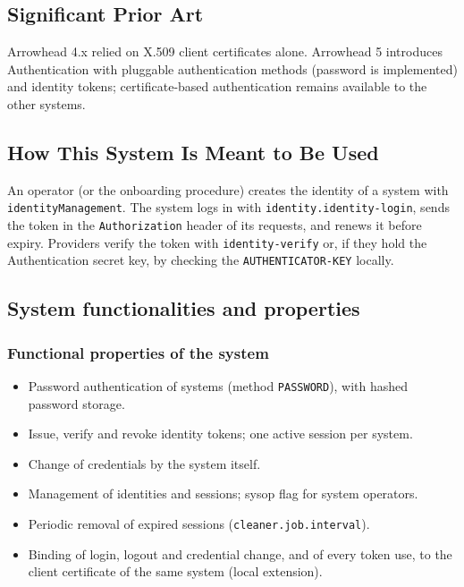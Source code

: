 \documentclass[a4paper]{arrowhead}
\begin{document}
\newpage

\subsection{Significant Prior Art}
\label{sec:prior_art}

Arrowhead 4.x relied on X.509 client certificates alone. Arrowhead 5 introduces Authentication with pluggable authentication methods (password is implemented) and identity tokens; certificate-based authentication remains available to the other systems.

\subsection{How This System Is Meant to Be Used}
\label{sec:use}

An operator (or the onboarding procedure) creates the identity of a system with \texttt{identityManagement}. The system logs in with \texttt{identity.\allowbreak{}identity-\allowbreak{}login}, sends the token in the \texttt{Authorization} header of its requests, and renews it before expiry. Providers verify the token with \texttt{identity-\allowbreak{}verify} or, if they hold the Authentication secret key, by checking the \texttt{AUTHENTICATOR-\allowbreak{}KEY} locally.

\subsection{System functionalities and properties}
\label{sec:properties}

\subsubsection{Functional properties of the system}

\begin{itemize}
  \item Password authentication of systems (method \texttt{PASSWORD}), with hashed password storage.
  \item Issue, verify and revoke identity tokens; one active session per system.
  \item Change of credentials by the system itself.
  \item Management of identities and sessions; sysop flag for system operators.
  \item Periodic removal of expired sessions (\texttt{cleaner.\allowbreak{}job.\allowbreak{}interval}).
  \item Binding of login, logout and credential change, and of every token use, to the client certificate of the same system (local extension).
\end{itemize}
\end{document}
